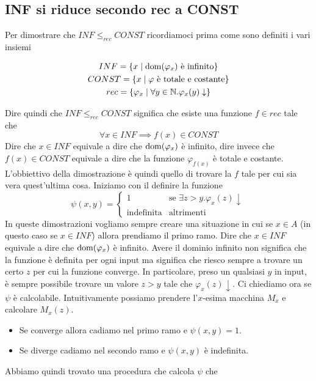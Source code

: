 \subsection{INF si riduce secondo rec a CONST}

Per dimostrare che $INF \leq_{rec} CONST$ ricordiamoci prima
come sono definiti i vari insiemi

\begin{gather*}
	INF = \{ x \mid \operatorname{dom} (\varphi_x) \text{ è infinito} \} \\
	CONST = \{ x \mid \varphi \text{ è totale e costante} \} \\
	rec = \{ \varphi_x \mid \forall y \in \mathbb{N} . \varphi_x (y) \downarrow \}
\end{gather*}

Dire quindi che $INF \leq_{rec} CONST$ significa che esiste una funzione
$f \in rec$ tale che
\[ \forall x \in INF \implies f(x) \in CONST \]
Dire che $x \in INF$ equivale a dire che $\operatorname{dom} (\varphi_x)$ è infinito,
dire invece che $f(x) \in CONST$ equivale a dire che la funzione
$\varphi_{f(x)}$ è totale e costante. L'obbiettivo della
dimostrazione è quindi quello di trovare la $f$ tale per cui sia
vera quest'ultima cosa. Iniziamo con il definire la funzione
\[
	\psi (x, y) = \begin{cases}
		1                 & \text{se } \exists z > y .
		\varphi_x(z) \downarrow                        \\
		\text{indefinita} & \text{altrimenti}
	\end{cases}
\]
In queste dimostrazioni vogliamo sempre creare una situazione
in cui se $x \in A$ (in questo caso se $x \in INF$) allora
prendiamo il primo ramo. Dire che $x \in INF$ equivale a dire
che $\operatorname{dom} (\varphi_x)$ è infinito. Avere il dominio infinito
non significa che la funzione è definita per ogni input ma
significa che riesco sempre a trovare un certo $z$ per cui
la funzione converge. In particolare, preso un qualsiasi $y$
in input, è sempre possibile trovare un valore $z > y$ tale che
$\varphi_x (z) \downarrow$. Ci chiediamo ora se $\psi$ è
calcolabile. Intuitivamente possiamo prendere l'$x$-esima
macchina $M_x$ e calcolare $M_x (z)$.
\begin{itemize}
	\item Se converge allora cadiamo nel primo ramo e
	      $\psi(x, y) = 1$.
	\item Se diverge cadiamo nel secondo ramo e
	      $\psi(x,y)$ è indefinita.
\end{itemize}
Abbiamo quindi trovato una procedura che calcola $\psi$ che
